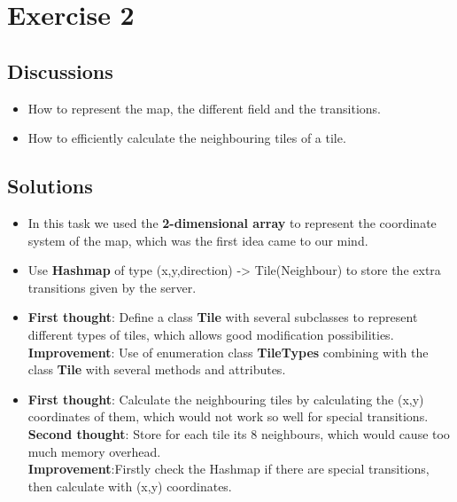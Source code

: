 \section{Exercise 2}
\subsection{Discussions}
\begin{itemize}
    \item How to represent the map, the different field and the transitions.
    \item How to efficiently calculate the neighbouring tiles of a tile.
\end{itemize}

\subsection{Solutions}
  \begin{itemize}
      \item In this task we used the \textbf{2-dimensional array} to represent the coordinate system of the map, which was the first idea came to our mind.
      \item Use \textbf{Hashmap} of type (x,y,direction) -> Tile(Neighbour) to store the extra transitions given by the server. 
      \item \textbf{First thought}: Define a class \textbf{Tile} with several subclasses to represent different types of tiles, which allows good modification possibilities.\\ \textbf{Improvement}: Use of enumeration class \textbf{TileTypes} combining with the class \textbf{Tile} with several methods and attributes.
      \item \textbf{First thought}: Calculate the neighbouring tiles by calculating the (x,y) coordinates of them, which would not work so well for special transitions.\\ \textbf{Second thought}: Store for each tile its 8 neighbours, which would cause too much memory overhead.\\ \textbf{Improvement}:Firstly check the Hashmap if there are special transitions, then calculate with (x,y) coordinates. 
  \end{itemize}
